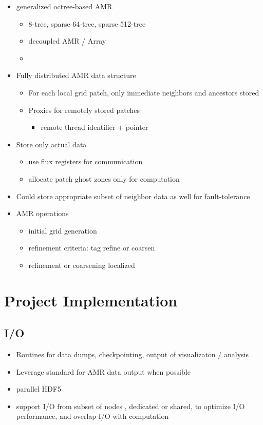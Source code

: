 \documentclass{article}
\begin{document}
\begin{itemize}
\item generalized octree-based AMR 
  \begin{itemize}
  \item 8-tree, sparse 64-tree, sparse 512-tree
  \item decoupled AMR / Array
  \item 
  \end{itemize}
\item Fully distributed AMR data structure
  \begin{itemize}
\item For each local grid patch, only immediate neighbors and
  ancestors stored
  \item Proxies for remotely stored patches
    \begin{itemize}
    \item remote thread identifier + pointer
    \end{itemize}
  \end{itemize}
\item Store only actual data
  \begin{itemize}
  \item use flux registers for communication
  \item allocate patch ghost zones only for computation
  \end{itemize}
\item Could store appropriate subset of neighbor data as well for
  fault-tolerance
\item AMR operations
  \begin{itemize}
  \item initial grid generation
  \item refinement criteria: tag refine or coarsen
  \item refinement or coarsening localized
  \end{itemize}
\end{itemize}


\section{Project Implementation}

\subsection{I/O}

\begin{itemize}
\item Routines for data dumps, checkpointing, output of visualizaton /
  analysis
\item Leverage standard for AMR data output when possible
\item parallel HDF5
\item support I/O from subset of nodes , dedicated or shared, to
  optimize I/O performance, and overlap I/O with computation
\end{itemize}
\end{document}
